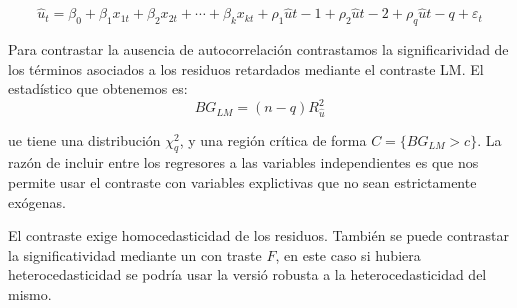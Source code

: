 \[\hat{u}_t=\beta_0+\beta_1x_{1t}+\beta_2x_{2t}+\cdots+\beta_kx_{kt}+\rho_1\hat{u}{t-1}+\rho_2\hat{u}{t-2}+\rho_q\hat{u}{t-q}+\varepsilon_t\]

Para contrastar la ausencia de autocorrelaci\'on contrastamos la significarividad de los t\'erminos asociados a los residuos retardados mediante el contraste LM. El estad\'istico que obtenemos es:
\[BG_{LM}=(n-q)R^2_{\hat{u}}\]

ue tiene una distribuci\'on $\chi^2_{q}$, y una regi\'on cr\'itica de forma $C=\{BG_{LM}>c\}$. La raz\'on de incluir entre los regresores a las variables independientes es que nos permite usar el contraste con variables explictivas que no sean estrictamente ex\'ogenas.

El contraste exige homocedasticidad de los residuos. Tambi\'en se puede contrastar la significatividad mediante un con traste $F$, en este caso si hubiera heterocedasticidad se podr\'ia usar la versi\'o robusta a la heterocedasticidad del mismo.